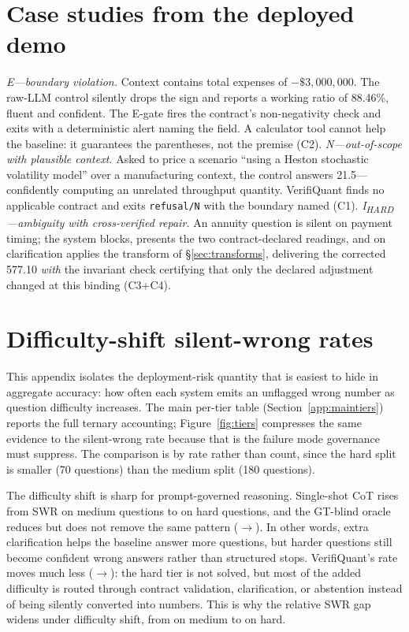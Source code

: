 \section{Case studies from the deployed demo}\label{sec:cases}
\emph{E---boundary violation.} Context contains total expenses of $-\$3{,}000{,}000$. The raw-LLM control silently drops the sign and reports a working ratio of 88.46\%, fluent and confident. The E-gate fires the contract's non-negativity check and exits with a deterministic alert naming the field. A calculator tool cannot help the baseline: it guarantees the parentheses, not the premise (C2).
\emph{N---out-of-scope with plausible context.} Asked to price a scenario ``using a Heston stochastic volatility model'' over a manufacturing context, the control answers 21.5---confidently computing an unrelated throughput quantity. VerifiQuant finds no applicable contract and exits \texttt{refusal/N} with the boundary named (C1).
\emph{I\textsubscript{HARD}---ambiguity with cross-verified repair.} An annuity question is silent on payment timing; the system blocks, presents the two contract-declared readings, and on clarification applies the transform of \S\ref{sec:transforms}, delivering the corrected 577.10 \emph{with} the invariant check certifying that only the declared adjustment changed at this binding (C3+C4).

\section{Difficulty-shift silent-wrong rates}\label{app:tiers}

This appendix isolates the deployment-risk quantity that is easiest to hide in aggregate accuracy: how often each system emits an unflagged wrong number as question difficulty increases.
The main per-tier table (Section~\ref{app:maintiers}) reports the full ternary accounting; Figure~\ref{fig:tiers} compresses the same evidence to the silent-wrong rate because that is the failure mode governance must suppress.
The comparison is by rate rather than count, since the hard split is smaller (70 questions) than the medium split (180 questions).

The difficulty shift is sharp for prompt-governed reasoning.
Single-shot CoT rises from \cotSWRMed{} SWR on medium questions to \cotSWRHard{} on hard questions, and the GT-blind oracle reduces but does not remove the same pattern (\cotoSWRMed{}$\rightarrow$\cotoSWRHard{}).
In other words, extra clarification helps the baseline answer more questions, but harder questions still become confident wrong answers rather than structured stops.
VerifiQuant's rate moves much less (\vqSWRMed{}$\rightarrow$\vqSWRHard{}): the hard tier is not solved, but most of the added difficulty is routed through contract validation, clarification, or abstention instead of being silently converted into numbers.
This is why the relative SWR gap widens under difficulty shift, from \vqSWRatioMed{} on medium to \vqSWRatioHard{} on hard.

